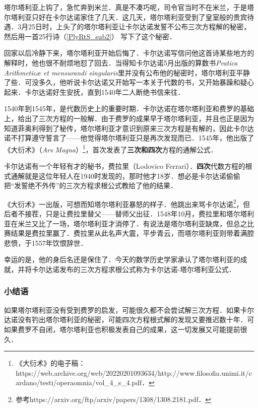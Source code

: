 塔尔塔利亚上钩了，急忙奔到米兰．真是不凑巧呢，司令官当时不在米兰，于是塔尔塔利亚只好在卡尔达诺家住了几天．这几天，塔尔塔利亚受到了皇室般的贵宾待遇．3月25日时，上头了的塔尔塔利亚让卡尔达诺发誓不公布三次方程解的秘密，然后用一首25行诗（\autoref{PlyRtS_sub2}） 写下了这个秘密．

回家以后冷静下来，塔尔塔利亚开始后悔了．卡尔达诺写信问他这首诗某些地方的解释时，他也很不耐烦地怼了回去．当得知卡尔达诺5月出版的算数书\textsl{Pratica Arithmeticæ et mensurandi singularis}里并没有公布他的秘密时，塔尔塔利亚平静了些．可没多久，他听说卡尔达诺又开始写一本关于代数的书，又开始暴躁和疑心起来．卡尔达诺好生安抚，直到1540年二人断绝书信来往．

1540年到1545年，是代数历史上的重要时期．卡尔达诺在塔尔塔利亚和费罗的基础上，给出了三次方程的一般解．由于费罗的成果早于塔尔塔利亚，并且也正是因为知道菲奥利得到了秘传，塔尔塔利亚才意识到原来三次方程是有解的，因此卡尔达诺不打算遵守誓言了——他觉得塔尔塔利亚只是再次发现而已．1545年，他出版了《大衍术》（\textsl{Ars Magna}）\footnote{《大衍术》的电子稿：https://web.archive.org/web/20220201093634/http://www.filosofia.unimi.it/cardano/testi/operaomnia/vol_4_s_4.pdf．}，首次发表了\textbf{三次和四次}方程的通解公式．

卡尔达诺有一个年轻有才的秘书，费拉里（Lodovico Ferrari）．\textbf{四次}代数方程的根式通解就是这位年轻人在1940时发现的，那时他才18岁．想必是卡尔达诺偷偷把“发誓绝不外传”的三次方程求根公式教给了他的结果．

《大衍术》一出版，可想而知塔尔塔利亚暴怒的样子．他跳出来骂卡尔达诺\footnote{参考https://arxiv.org/ftp/arxiv/papers/1308/1308.2181.pdf．}，但后者不接茬，只是让费拉里替父——替师父出征．1548年10月，费拉里和塔尔塔利亚在米兰又比了一场，塔尔塔利亚才消停了．有说法是塔尔塔利亚缺席，但总之比赛结果是费拉里赢了．费拉里从此名声大震，平步青云，而塔尔塔利亚则带着满腔悲愤，于1557年饮恨辞世．

幸运的是，他的身后名还是保住了．今天的数学历史学家承认了塔尔塔利亚的成就，并将卡尔达诺发布的三次方程求根公式称为卡尔达诺-塔尔塔利亚公式．






\subsubsection{小结语}

如果塔尔塔利亚没有受到费罗的启发，可能很久都不会尝试解三次方程．如果卡尔达诺没有钓出塔尔塔利亚的秘密，可能四次方程根式解的发现又要推迟数十年．可如果费罗不自闭，塔尔塔利亚也积极发表自己的成果，这一切发展又可能提前很久．

